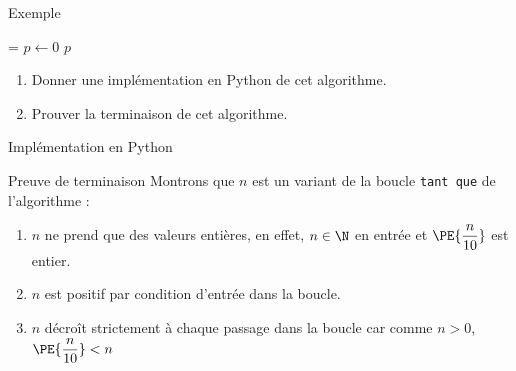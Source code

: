 \documentclass[10pt,french]{beamer}
\begin{document}
\begin{frame}[fragile]{\Ctitle}{\stitle}
	\begin{exampleblock}{Exemple}
		\SetAlFnt{\small}
		\setlength{\algomargin}{8pt}
		\begin{algorithm}[H]
			\DontPrintSemicolon
			\caption{Nombre de chiffres en base 10}
			\everypar={\footnotesize \textcolor{gray}{\nl}}
			$p \leftarrow 0$\;
			\Return $p$
		\end{algorithm}
		\begin{enumerate}
			\item<2-> Donner une implémentation en Python de cet algorithme.
			\item<3-> Prouver la terminaison de cet algorithme.
		\end{enumerate}
	\end{exampleblock}
\end{frame}

\begin{frame}{\Ctitle}{\stitle}
	\begin{exampleblock}{Implémentation en Python}
	\end{exampleblock}
\end{frame}

\begin{frame}{\Ctitle}{\stitle}
	\begin{exampleblock}{Preuve de terminaison}
		Montrons que $n$ est un variant de la boucle {\tt tant que} de l'algorithme :
		\begin{enumerate}
			\item<1-> $n$ ne prend que des valeurs entières, en effet, $n \in \N$  en entrée et $\PE{\dfrac{n}{10}}$ est entier.
			\item<2-> $n$ est positif  par condition d'entrée dans la boucle.
			\item<3-> $n$ décroît strictement à chaque passage dans la boucle car comme $n > 0$, $\PE{\dfrac{n}{10}} < n$
		\end{enumerate}
	\end{exampleblock}
\end{frame}
\end{document}
